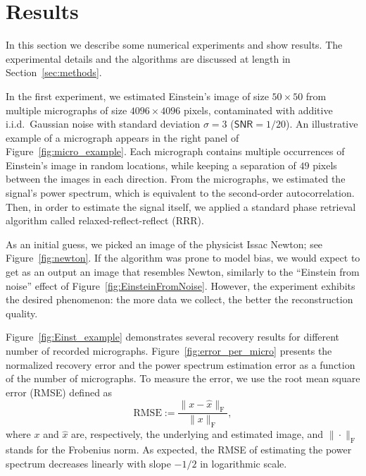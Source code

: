 \documentclass[english,11pt]{article}
\newcommand{\TODO}[1]{{\color{red}{[#1]}}}
\numberwithin{equation}{section}
\theoremstyle{plain}
\theoremstyle{definition}
\theoremstyle{remark}
\theoremstyle{plain}
\theoremstyle{remark}
\theoremstyle{plain}
\theoremstyle{plain}
\newcommand{\SNR}{{\textsf{SNR}}}
\begin{document}
\section{Results}

In this section we describe  some numerical experiments and show results. The experimental details and the algorithms are discussed at length in Section~\ref{sec:methods}.

In the first experiment, we estimated Einstein's image of size $50\times 50$ from multiple micrographs of size $4096\times 4096$ pixels, contaminated  with additive i.i.d.\ Gaussian noise with standard deviation $\sigma=3$ ($\SNR=1/20$). An illustrative example of a micrograph appears in the right panel of Figure~\ref{fig:micro_example}.
Each micrograph contains multiple occurrences of Einstein's image  in random locations, while keeping a separation of  $49$ pixels between the images in each direction. From the micrographs, we estimated the signal's power spectrum, which is equivalent to the second-order autocorrelation. Then, in order to estimate the signal itself, we applied a standard phase retrieval algorithm called relaxed-reflect-reflect (RRR).

As an initial guess, we picked an image of the physicist Issac Newton; see Figure~\ref{fig:newton}. If the algorithm was prone to model bias, we would expect to get as an output an image that resembles Newton, similarly to the ``Einstein from noise'' effect of Figure~\ref{fig:EinsteinFromNoise}. However, the experiment exhibits the desired phenomenon: the more data we collect, the better the reconstruction quality. 

Figure~\ref{fig:Einst_example} demonstrates several recovery results for different number of recorded micrographs. Figure~\ref{fig:error_per_micro} presents the normalized recovery error and the power spectrum estimation error as a function of the number of micrographs.
To measure the error, we use the root mean square error (RMSE) defined as 
\begin{equation}
\text{RMSE}  := \frac{\|x - \hat{x}\|_{\text{F}}}{\|x \|_{\text{F}}},
\end{equation} 
where $x$ and $\hat{x}$ are, respectively, the underlying and estimated image, and $\|\cdot\|_{\text{F}}$ stands for the Frobenius norm. 
As expected, the RMSE of estimating the power spectrum   decreases linearly with slope $-1/2$ in logarithmic scale. 
\TODO{Few comments: 1. We have a movie in the supplementary material. 2. Does the error also have the right slope? 3. We can put more images to exemplify the progress 4. Need to improve the micrograph's generation code  }
\end{document}

